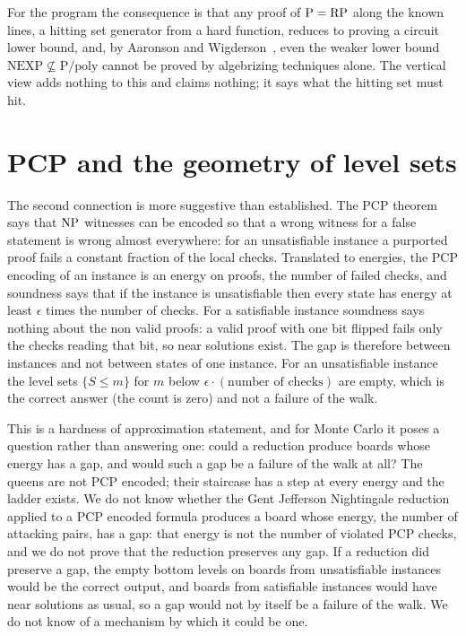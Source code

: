 For the program the consequence is that any proof of $\mathrm{P} = \mathrm{RP}$ along the known lines, a hitting set generator from a hard function, reduces to proving a circuit lower bound, and, by Aaronson and Wigderson~\cite{AaronsonWigderson}, even the weaker lower bound $\mathrm{NEXP} \not\subseteq \mathrm{P/poly}$ cannot be proved by algebrizing techniques alone. The vertical view adds nothing to this and claims nothing; it says what the hitting set must hit.

\section{PCP and the geometry of level sets}

The second connection is more suggestive than established. The PCP theorem says that $\mathrm{NP}$ witnesses can be encoded so that a wrong witness for a false statement is wrong almost everywhere: for an unsatisfiable instance a purported proof fails a constant fraction of the local checks. Translated to energies, the PCP encoding of an instance is an energy on proofs, the number of failed checks, and soundness says that if the instance is unsatisfiable then every state has energy at least $\epsilon$ times the number of checks. For a satisfiable instance soundness says nothing about the non valid proofs: a valid proof with one bit flipped fails only the checks reading that bit, so near solutions exist. The gap is therefore between instances and not between states of one instance. For an unsatisfiable instance the level sets $\{ S \le m \}$ for $m$ below $\epsilon \cdot (\text{number of checks})$ are empty, which is the correct answer (the count is zero) and not a failure of the walk.

This is a hardness of approximation statement, and for Monte Carlo it poses a question rather than answering one: could a reduction produce boards whose energy has a gap, and would such a gap be a failure of the walk at all? The queens are not PCP encoded; their staircase has a step at every energy and the ladder exists. We do not know whether the Gent Jefferson Nightingale reduction applied to a PCP encoded formula produces a board whose energy, the number of attacking pairs, has a gap: that energy is not the number of violated PCP checks, and we do not prove that the reduction preserves any gap. If a reduction did preserve a gap, the empty bottom levels on boards from unsatisfiable instances would be the correct output, and boards from satisfiable instances would have near solutions as usual, so a gap would not by itself be a failure of the walk. We do not know of a mechanism by which it could be one.

